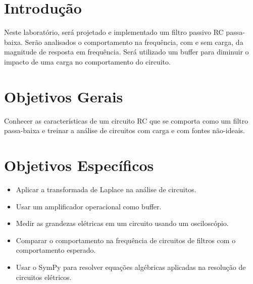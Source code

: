 \documentclass[
	12pt,				%
	openright,			%
	twoside,			%
	a4paper,			%
	english,			%
	french,				%
	spanish,			%
	brazil,				%
	]{abntex2}
\begin{document}

\frenchspacing 


\imprimircapa

\imprimirfolhaderosto*




\textual



\chapter{Introdução}
Neste laboratório, será projetado e implementado um filtro passivo RC passa-baixa. Serão analisados o comportamento na frequência, com e sem carga, da magnitude de resposta em frequência. Será utilizado um buffer para diminuir o impacto de uma carga no comportamento do circuito.

\chapter{Objetivos Gerais}
Conhecer as características de um circuito RC que se comporta como um filtro passa-baixa e treinar a análise de circuitos com carga e com fontes não-ideais.

\chapter{Objetivos Específicos}
\begin{itemize}
    \item Aplicar a transformada de Laplace na análise de circuitos.
    \item Usar um amplificador operacional como buffer.
    \item Medir as grandezas elétricas em um circuito usando um osciloscópio.
    \item Comparar o comportamento na frequência de circuitos de filtros com o comportamento esperado.
    \item Usar o SymPy para resolver equações algébricas aplicadas na resolução de circuitos elétricos.
\end{itemize}
\end{document}
